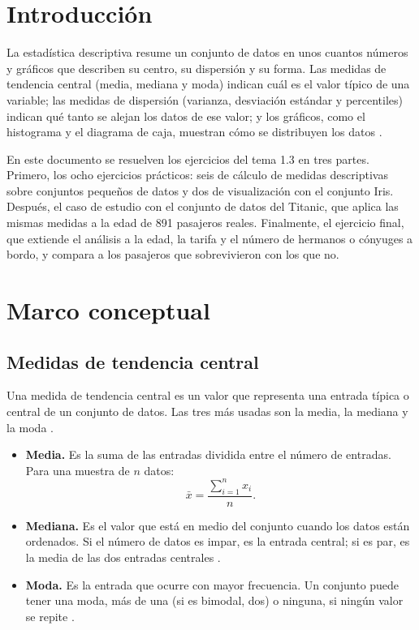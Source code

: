 \documentclass[11pt,letterpaper]{article}
\begin{document}
\portada
\indicegeneral


\section{Introducción}

La estadística descriptiva resume un conjunto de datos en unos cuantos números y gráficos que describen su centro, su dispersión y su forma. Las medidas de tendencia central (media, mediana y moda) indican cuál es el valor típico de una variable; las medidas de dispersión (varianza, desviación estándar y percentiles) indican qué tanto se alejan los datos de ese valor; y los gráficos, como el histograma y el diagrama de caja, muestran cómo se distribuyen los datos \parencite{tecnm2026_documento_fuente,bruce2020}.

En este documento se resuelven los ejercicios del tema 1.3 en tres partes. Primero, los ocho ejercicios prácticos: seis de cálculo de medidas descriptivas sobre conjuntos pequeños de datos y dos de visualización con el conjunto Iris. Después, el caso de estudio con el conjunto de datos del Titanic, que aplica las mismas medidas a la edad de 891 pasajeros reales. Finalmente, el ejercicio final, que extiende el análisis a la edad, la tarifa y el número de hermanos o cónyuges a bordo, y compara a los pasajeros que sobrevivieron con los que no.

\section{Marco conceptual}

\subsection{Medidas de tendencia central}

Una medida de tendencia central es un valor que representa una entrada típica o central de un conjunto de datos. Las tres más usadas son la media, la mediana y la moda \parencite{tecnm2026_documento_fuente}.

\begin{itemize}
    \item \textbf{Media.} Es la suma de las entradas dividida entre el número de entradas. Para una muestra de $n$ datos:
    \begin{equation}
        \bar{x} = \frac{\sum_{i=1}^{n} x_i}{n}.
    \end{equation}
    \item \textbf{Mediana.} Es el valor que está en medio del conjunto cuando los datos están ordenados. Si el número de datos es impar, es la entrada central; si es par, es la media de las dos entradas centrales \parencite{tecnm2026_documento_fuente}.
    \item \textbf{Moda.} Es la entrada que ocurre con mayor frecuencia. Un conjunto puede tener una moda, más de una (si es bimodal, dos) o ninguna, si ningún valor se repite \parencite{tecnm2026_documento_fuente}.
\end{itemize}
\end{document}
